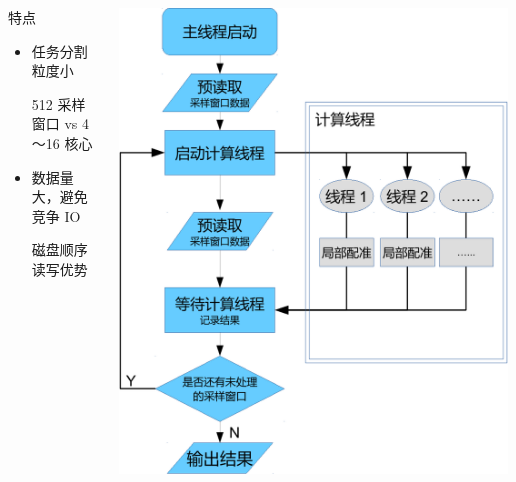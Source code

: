 \documentclass{beamer}
\begin{document}
\begin{frame}
\begin{columns}
\begin{column}{0.5\textwidth}
            \begin{block}{特点}
            \begin{itemize}
                \item 任务分割粒度小 \\ \begin{scriptsize} 512 采样窗口 vs 4～16 核心 \end{scriptsize}
                \item 数据量大，避免竞争 IO \\ \begin{scriptsize} 磁盘顺序读写优势 \end{scriptsize}
            \end{itemize}
            \end{block}
        \end{column}
        \begin{column}{0.5\textwidth}
            \centering
            \includegraphics[width=0.99\textwidth]{figures/parallel.pdf}
        \end{column}
    \end{columns}
\end{frame}
\end{document}
